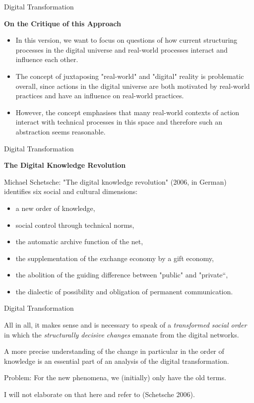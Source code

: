 \documentclass{beamer}
\newcommand{\ueberschrift}[1]{\begin{center}\bf #1\end{center}}
\begin{document}
\begin{frame}{Digital Transformation}
  \ueberschrift{On the Critique of this Approach}
  \begin{itemize}
  \item In this version, we want to focus on questions of how current
    structuring processes in the digital universe and real-world processes
    interact and influence each other.
  \item The concept of juxtaposing "real-world" and "digital" reality is
    problematic overall, since actions in the digital universe are both
    motivated by real-world practices and have an influence on real-world
    practices.
 \item However, the concept emphasises that many real-world contexts of action
   interact with technical processes in this space and therefore such an
   abstraction seems reasonable.
  \end{itemize}
\end{frame}
\begin{frame}{Digital Transformation}
  \ueberschrift{The Digital Knowledge Revolution}

Michael Schetsche: "The digital knowledge revolution" (2006, in German)
identifies six social and cultural dimensions:
\begin{itemize}
\item a new order of knowledge,
\item social control through technical norms,
\item the automatic archive function of the net,
\item the supplementation of the exchange economy by a gift economy,
\item the abolition of the guiding difference between "public" and "private“, 
\item the dialectic of possibility and obligation of permanent communication.
\end{itemize}
\end{frame}
\begin{frame}{Digital Transformation}

All in all, it makes sense and is necessary to speak of a \emph{transformed
  social order} in which the \emph{structurally decisive changes} emanate from
the digital networks.

  A more precise understanding of the change in particular in the order of
  knowledge is an essential part of an analysis of the digital transformation.

  Problem: For the new phenomena, we (initially) only have the old terms.

  I will not elaborate on that here and refer to (Schetsche 2006).

\end{frame}
\end{document}
